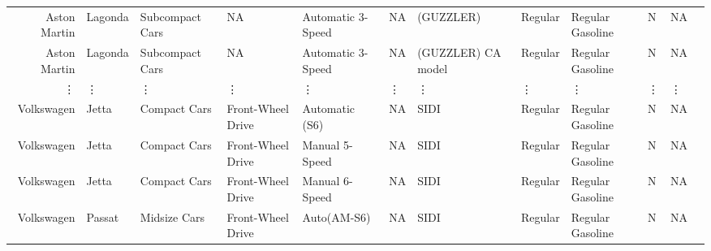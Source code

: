 \documentclass[11pt]{article}
\begin{document}
\begin{tabular}{r|lllllllllll}
	 Aston Martin                & Lagonda                     & Subcompact Cars             & NA                          & Automatic 3-Speed           & NA                          & (GUZZLER)                   & Regular                     & Regular Gasoline            & N                           & NA                         \\
	 Aston Martin                & Lagonda                     & Subcompact Cars             & NA                          & Automatic 3-Speed           & NA                          & (GUZZLER) CA model          & Regular                     & Regular Gasoline            & N                           & NA                         \\
	 ⋮ & ⋮ & ⋮ & ⋮ & ⋮ & ⋮ & ⋮ & ⋮ & ⋮ & ⋮ & ⋮\\
	 Volkswagen                         & Jetta                              & Compact Cars                       & Front-Wheel Drive                  & Automatic (S6)                     & NA                                 & SIDI                               & Regular                            & Regular Gasoline                   & N                                  & NA                                \\
	 Volkswagen                         & Jetta                              & Compact Cars                       & Front-Wheel Drive                  & Manual 5-Speed                     & NA                                 & SIDI                               & Regular                            & Regular Gasoline                   & N                                  & NA                                \\
	 Volkswagen                         & Jetta                              & Compact Cars                       & Front-Wheel Drive                  & Manual 6-Speed                     & NA                                 & SIDI                               & Regular                            & Regular Gasoline                   & N                                  & NA                                \\
	 Volkswagen                         & Passat                             & Midsize Cars                       & Front-Wheel Drive                  & Auto(AM-S6)                        & NA                                 & SIDI                               & Regular                            & Regular Gasoline                   & N                                  & NA                                \\

\end{tabular}
\end{document}
